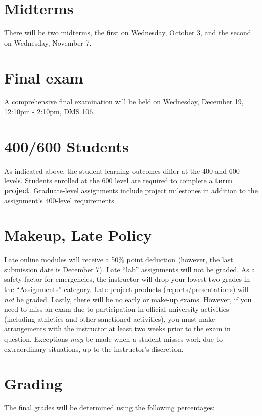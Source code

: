\documentclass[11pt,onecolumn]{article}
\begin{document}
\section*{Midterms}
There will be two midterms, the first on Wednesday, October 3, and the second on Wednesday, November 7.

\section*{Final exam}
A comprehensive final examination will be held on Wednesday, December 19, 12:10pm - 2:10pm, DMS 106.

\section*{400/600 Students}
As indicated above, the student learning outcomes differ at the 400 and 600 levels. Students enrolled at the 600 level are required to complete a \textbf{term project}. Graduate-level assignments include project milestones in addition to the assignment's 400-level requirements.

\section*{Makeup, Late Policy}
Late online modules will receive a 50\% point deduction (however, the last submission date is December 7). Late ``lab'' assignments will not be graded. As a safety factor for emergencies, the instructor will drop your lowest two grades in the ``Assignments'' category. Late project products (reports/presentations) will \textit{not} be graded. Lastly, there will be no early or make-up exams. However, if you need to miss an exam due to participation in official university activities (including athletics and other sanctioned activities), you must make arrangements with the instructor at least two weeks prior to the exam in question. Exceptions \textit{may} be made when a student misses work due to extraordinary situations, up to the instructor's discretion.

\newpage
\section*{Grading}
The final grades will be determined using the following percentages:
\end{document}
